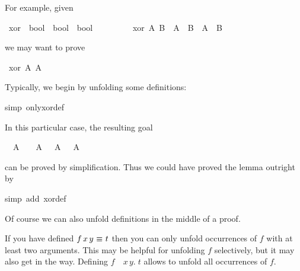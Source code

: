 \begin{isabellebody}
\begin{isamarkuptext}
For example, given%
\end{isamarkuptext}%
\isamarkuptrue%
\ xor\ {\isacharcolon}{\isacharcolon}\ {\isachardoublequote}bool\ {\isasymRightarrow}\ bool\ {\isasymRightarrow}\ bool{\isachardoublequote}\isanewline
\ \ \ \ \ \ \ \ \ {\isachardoublequote}xor\ A\ B\ {\isasymequiv}\ {\isacharparenleft}A\ {\isasymand}\ {\isasymnot}B{\isacharparenright}\ {\isasymor}\ {\isacharparenleft}{\isasymnot}A\ {\isasymand}\ B{\isacharparenright}{\isachardoublequote}\isamarkupfalse%
%
\begin{isamarkuptext}%
\noindent
we may want to prove%
\end{isamarkuptext}%
\isamarkuptrue%
\ {\isachardoublequote}xor\ A\ {\isacharparenleft}{\isasymnot}A{\isacharparenright}{\isachardoublequote}\isamarkupfalse%
%
\begin{isamarkuptxt}%
\noindent
Typically, we begin by unfolding some definitions:
%
\end{isamarkuptxt}%
\isamarkuptrue%
simp\ only{\isacharcolon}xor{\isacharunderscore}def{\isacharparenright}\isamarkupfalse%
%
\begin{isamarkuptxt}%
\noindent
In this particular case, the resulting goal
\begin{isabelle}%
\ {}{\isachardot}\ A\ {\isasymand}\ {\isasymnot}\ {\isasymnot}\ A\ {\isasymor}\ {\isasymnot}\ A\ {\isasymand}\ {\isasymnot}\ A%
\end{isabelle}
can be proved by simplification. Thus we could have proved the lemma outright by%
\end{isamarkuptxt}%
\isamarkuptrue%
\isamarkupfalse%
\isamarkupfalse%
simp\ add{\isacharcolon}\ xor{\isacharunderscore}def{\isacharparenright}\isamarkupfalse%
\isamarkupfalse%
%
\begin{isamarkuptext}%
\noindent
Of course we can also unfold definitions in the middle of a proof.

\begin{warn}
  If you have defined $f\,x\,y~\emph{$\equiv$}~t$ then you can only unfold
  occurrences of $f$ with at least two arguments. This may be helpful for unfolding
  $f$ selectively, but it may also get in the way. Defining
  $f$~\isasymequiv~\isasymlambda$x\,y.\;t$ allows to unfold all occurrences of $f$.
\end{warn}


\end{isamarkuptext}
\end{isabellebody}
